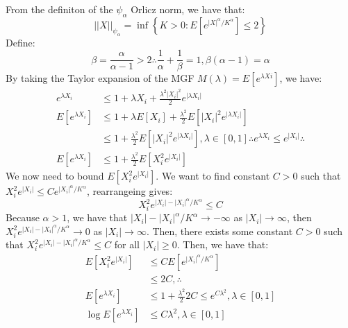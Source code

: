 \documentclass[11pt,a4paper,margin=1in]{article}
\begin{document}
\section{}
From the definiton of the $\psi_\alpha$ Orlicz norm, we have that:
\[
    ||X||_{\psi_\alpha} = \inf\left\{K > 0 : E\left[e^{|X|^\alpha/K^\alpha}\right] \leq 2\right\}
\]
Define:
\[
    \beta = \frac{\alpha}{\alpha - 1} > 2 \therefore \frac{1}{\alpha} + \frac{1}{\beta} = 1, \beta(\alpha - 1) = \alpha
\]
By taking the Taylor expansion of the MGF $M(\lambda) = E[e^{\lambda Xi}]$, we have:
\begin{align*}
    e^{\lambda X_i} &\leq 1 + \lambda X_i + \frac{\lambda^2 |X_i|^2}{2} e^{|\lambda X_i|} \\
    E[e^{\lambda X_i}] &\leq 1 + \lambda E[X_i] + \frac{\lambda^2}{2} E[|X_i|^2 e^{|\lambda X_i|}] \\
    &\leq 1 + \frac{\lambda^2}{2} E[|X_i|^2 e^{|\lambda X_i|}], \lambda \in [0, 1] \therefore e^{\lambda X_i} \leq e^{|X_i|} \therefore \\
    E[e^{\lambda X_i}] &\leq 1 + \frac{\lambda^2}{2} E[X_i^2 e^{|X_i|}]
\end{align*}
We now need to bound $E[X_i^2 e^{|X_i|}]$. We want to find constant $C > 0$ such
that $X_i^2 e^{|X_i|} \leq C e^{|X_i|^\alpha/K^\alpha}$, rearrangeing gives:
\[
    X_i^2 e^{|X_i| - |X_i|^\alpha/K^\alpha} \leq C
\]
Because $\alpha > 1$, we have that $|X_i| - |X_i|^\alpha/K^\alpha \to -\infty$ as 
$|X_i| \to \infty$, then $X_i^2 e^{|X_i| - |X_i|^\alpha/K^\alpha} \to 0$ as 
$|X_i| \to \infty$. Then, there exists some constant $C > 0$ such that 
$X_i^2 e^{|X_i| - |X_i|^\alpha/K^\alpha} \leq C$ for all $|X_i| \geq 0$. Then, we 
have that:
\begin{align*}
    E[X_i^2 e^{|X_i|}] &\leq C E[e^{|X_i|^\alpha/K^\alpha}] \\
    &\leq 2C, \therefore \\
    E[e^{\lambda X_i}] &\leq 1 + \frac{\lambda^2}{2} 2C \leq e^{C\lambda^2}, \lambda \in [0, 1] \\
    \log E[e^{\lambda X_i}] &\leq C \lambda^2, \lambda \in [0, 1] \\
\end{align*}
\end{document}
